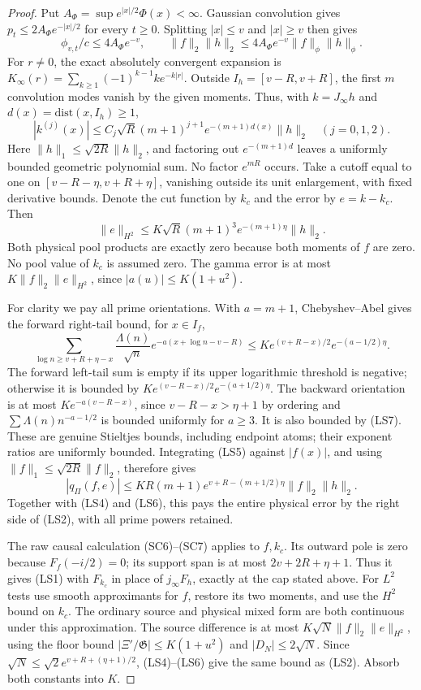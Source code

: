\documentclass[11pt]{article}
\theoremstyle{remark}\newtheorem{remark}[theorem]{Remark}
\newcommand{\dist}{\mathrm{dist}}
\begin{document}
\begin{proof}
Put \(A_\Phi=\sup e^{|x|/2}\Phi(x)<\infty\).
Gaussian convolution gives \(p_t\le2A_\Phi e^{-|x|/2}\)
for every \(t\ge0\). Splitting \(|x|\le v\) and \(|x|\ge v\)
then gives
\[
 \phi_{v,t}/c\le4A_\Phi e^{-v},\qquad
 \|f\|_2\|h\|_2\le4A_\Phi e^{-v}\|f\|_\phi\|h\|_\phi.
                                                               \tag{LS4}
\]
For \(r\ne0\), the exact absolutely convergent expansion is
\(K_\infty(r)=\sum_{k\ge1}(-1)^{k-1}ke^{-k|r|}\).
Outside \(I_h=[v-R,v+R]\), the first \(m\) convolution modes
vanish by the given moments. Thus, with \(k=J_\infty h\) and
\(d(x)=\dist(x,I_h)\ge1\),
\[
 |k^{(j)}(x)|\le C_j\sqrt R(m+1)^{j+1}e^{-(m+1)d(x)}\|h\|_2
                         \quad(j=0,1,2).              \tag{LS5}
\]
Here \(\|h\|_1\le\sqrt{2R}\|h\|_2\), and factoring out
\(e^{-(m+1)d}\) leaves a uniformly bounded geometric polynomial
sum. No factor \(e^{mR}\) occurs.
Take a cutoff equal to one on
\([v-R-\eta,v+R+\eta]\), vanishing outside its unit enlargement,
with fixed derivative bounds. Denote the cut function by \(k_c\)
and the error by \(e=k-k_c\). Then
\[
 \|e\|_{H^2}\le K\sqrt R(m+1)^3e^{-(m+1)\eta}\|h\|_2.
                                                               \tag{LS6}
\]
Both physical pool products are exactly zero because both moments
of \(f\) are zero. No pool value of \(k_c\) is assumed zero.
The gamma error is at most \(K\|f\|_2\|e\|_{H^2}\), since
\(|a(u)|\le K(1+u^2)\).

For clarity we pay all prime orientations. With \(a=m+1\),
Chebyshev--Abel gives the forward right-tail bound, for \(x\in I_f\),
\[
 \sum_{\log n\ge v+R+\eta-x}\frac{\Lambda(n)}{\sqrt n}
 e^{-a(x+\log n-v-R)}
 \le Ke^{(v+R-x)/2}e^{-(a-1/2)\eta}.                 \tag{LS7}
\]
The forward left-tail sum is empty if its upper logarithmic
threshold is negative; otherwise it is bounded by
\(Ke^{(v-R-x)/2}e^{-(a+1/2)\eta}\).
The backward orientation is at most
\(Ke^{-a(v-R-x)}\), since \(v-R-x>\eta+1\) by ordering and
\(\sum\Lambda(n)n^{-a-1/2}\) is bounded uniformly for \(a\ge3\).
It is also bounded by (LS7). These are genuine Stieltjes bounds,
including endpoint atoms; their exponent ratios are uniformly
bounded. Integrating (LS5) against \(|f(x)|\), and using
\(\|f\|_1\le\sqrt{2R}\|f\|_2\), therefore gives
\[
 |q_\Pi(f,e)|\le KR(m+1)e^{v+R-(m+1/2)\eta}\|f\|_2\|h\|_2.
\]
Together with (LS4) and (LS6), this pays the entire physical
error by the right side of (LS2), with all prime powers retained.

The raw causal calculation (SC6)--(SC7) applies to \(f,k_c\).
Its outward pole is zero because \(F_f(-i/2)=0\); its support
span is at most \(2v+2R+\eta+1\). Thus it gives (LS1) with
\(F_{k_c}\) in place of \(j_\infty F_h\), exactly at the cap
stated above. For \(L^2\) tests use smooth approximants for
\(f\), restore its two moments, and use the \(H^2\) bound on
\(k_c\). The ordinary source and physical mixed form are both
continuous under this approximation. The source difference is
at most
\(K\sqrt N\|f\|_2\|e\|_{H^2}\), using the floor bound
\(|\Xi'/\mathfrak G|\le K(1+u^2)\) and \(|D_N|\le2\sqrt N\).
Since \(\sqrt N\le\sqrt2e^{v+R+(\eta+1)/2}\), (LS4)--(LS6)
give the same bound as (LS2). Absorb both constants into \(K\).


\end{proof}
\end{document}
